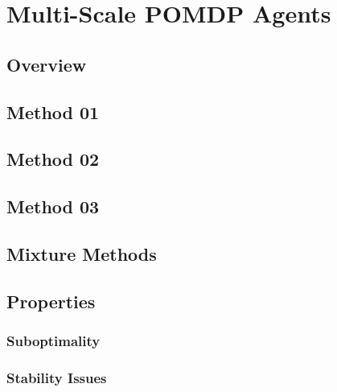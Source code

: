 \section{Multi-Scale POMDP Agents}\label{sec:MultiScale}
\subsection{Overview}
\subsection{Method 01}
\subsection{Method 02}
\subsection{Method 03}
\subsection{Mixture Methods}
\subsection{Properties}
\subsubsection{Suboptimality}
\subsubsection{Stability Issues}

